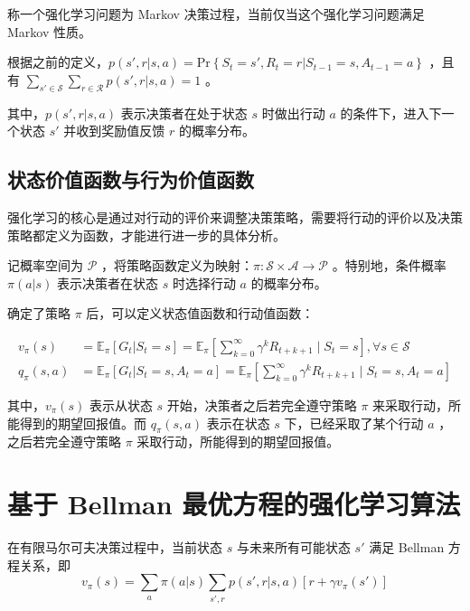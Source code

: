 \begin{definition}
    称一个强化学习问题为 Markov 决策过程，当前仅当这个强化学习问题满足 Markov 性质\cite{sutton2018reinforcement}\cite{howard1960dynamic}。
\end{definition}

根据之前的定义，$p(s',r|s,a) =\mathrm{Pr}\left\{S_t=s',R_t=r|S_{t-1}=s,A_{t-1}=a\right\}$ ，且有 $\sum_{s'\in\mathcal{S}}\sum_{r\in\mathcal{R}}p(s',r|s,a)=1$ 。

其中，$p(s',r|s,a)$ 表示决策者在处于状态 $s$ 时做出行动 $a$ 的条件下，进入下一个状态 $s'$ 并收到奖励值反馈 $r$ 的概率分布。

\subsection{状态价值函数与行为价值函数}

强化学习的核心是通过对行动的评价来调整决策策略，需要将行动的评价以及决策策略都定义为函数，才能进行进一步的具体分析。

记概率空间为 $\mathcal P$ ，将策略函数定义为映射：$\pi:\mathcal{S}\times\mathcal{A}\to \mathcal{P}$ 。特别地，条件概率 $\pi(a|s)$ 表示决策者在状态 $s$ 时选择行动 $a$ 的概率分布。

确定了策略 $\pi$ 后，可以定义状态值函数和行动值函数：

\begin{equation}
    \begin{aligned}
        v_{\pi}(s) &=\mathbb{E}_{\pi}\left[G_t|S_t=s\right]=\mathbb{E}_{\pi}\left[\sum_{k=0}^{\infty}\gamma^kR_{t+k+1}\mid S_t=s\right], \forall s \in \mathcal{S}\\
        q_{\pi}(s,a) &=\mathbb{E}_{\pi}\left[G_t|S_t=s,A_t=a\right]=\mathbb{E}_{\pi}\left[\sum_{k=0}^{\infty}\gamma^kR_{t+k+1}\mid S_t=s,A_t=a\right]
    \end{aligned}
\end{equation}

其中，$v_\pi(s)$ 表示从状态 $s$ 开始，决策者之后若完全遵守策略 $\pi$ 来采取行动，所能得到的期望回报值。而 $q_\pi(s,a)$ 表示在状态 $s$ 下，已经采取了某个行动 $a$ ，之后若完全遵守策略 $\pi$ 采取行动，所能得到的期望回报值。

\section{基于 Bellman 最优方程的强化学习算法}

\begin{definition}
    在有限马尔可夫决策过程中，当前状态 $s$ 与未来所有可能状态 $s'$ 满足 Bellman 方程关系，即
    \begin{equation}
        v_{\pi}(s) = \sum_a\pi(a|s)\sum_{s',r}p(s',r|s,a)\left[r+\gamma v_\pi(s') \right]
    \end{equation}
\end{definition}

